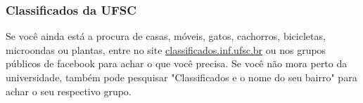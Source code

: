 \subsubsection{Classificados da UFSC}
Se você ainda está a procura de casas, móveis, gatos, cachorros, bicicletas, microondas ou plantas, entre no site \url{classificados.inf.ufsc.br}
ou nos grupos públicos de facebook para achar o que você precisa. Se você não mora perto da universidade, também pode pesquisar "Classificados e o nome do seu bairro"  para achar o seu respectivo grupo.
